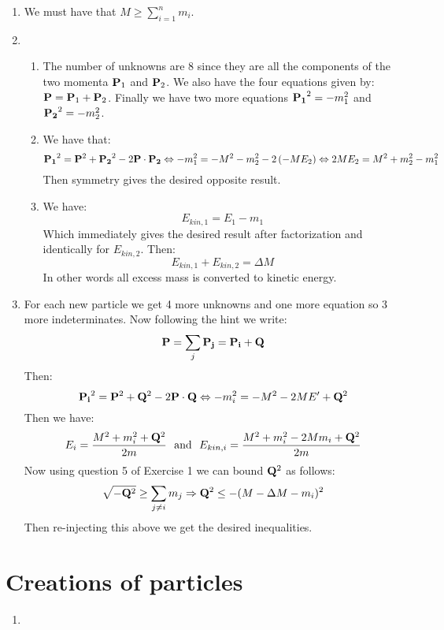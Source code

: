 \documentclass[10pt,a4paper]{book}
\begin{document}
\begin{enumerate}

\item We must have that $M \geq \sum_{i = 1}^n m_i$. 

\item \begin{enumerate}

\item The number of unknowns are 8 since they are all the components of the two momenta $\vb{P}_1$ and $\vb{P}_2$. We also have the four equations given by: $\vb{P} = \vb{P}_1 + \vb{P}_2$. Finally we have two more equations $\vb{P_1}^2 = - m_1^2$ and $\vb{P_2}^2 = -m_2^2$. 

\item We have that:
\[
\vb{P_1}^2 = \vb{P}^2 + \vb{P_2}^2 - 2 \vb{P} \cdot \vb{P_2} \Leftrightarrow - m_1^2 = - M^2 - m_2^2 - 2 \left( - M E_2 \right) \Leftrightarrow 2 M E_2 = M^2 + m_2^2 - m_1^2  
\]
Then symmetry gives the desired opposite result.

\item We have:
\[
E_{kin, 1} = E_1 - m_1
\]
Which immediately gives the desired result after factorization and identically for $E_{kin, 2}$. Then:
\[
E_{kin, 1} + E_{kin, 2} = \Delta M 
\]
In other words all excess mass is converted to kinetic energy.

\end{enumerate}

\item For each new particle we get 4 more unknowns and one more equation so 3 more indeterminates. Now following the hint we write:
\[
\vb{P} = \sum_j \vb{P_j} = \vb{P_i} + \vb{Q}
\]
Then:
\[
\vb{P_i}^2 = \vb{P}^2 + \vb{Q}^2 - 2 \vb{P} \cdot \vb{Q}  \Leftrightarrow - m_i^2 = - M^2 - 2 M E' + \vb{Q}^2 
\]
Then we have:
\[
E_i = \frac{M^2 + m_i^2 + \vb{Q}^2}{2m} \mbox{~~and~~} E_{kin, i} = \frac{M^2 + m_i^2 - 2 M m_i + \vb{Q}^2}{2m}
\]
Now using question 5 of Exercise 1 we can bound $\vb{Q}^2$ as follows:
\[
\sqrt{-\vb{Q}^2} \geq \sum_{j \neq i} m_j \Rightarrow \vb{Q}^2 \leq -(M - \Delta M - m_i)^2
\]
Then re-injecting this above we get the desired inequalities. 


\end{enumerate}

\section{Creations of particles}

\begin{enumerate}

\item 

\end{enumerate}
\end{document}
